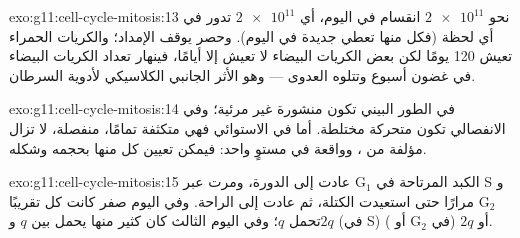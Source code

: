 \begin{solution}{exo:g11:cell-cycle-mitosis:13}
نحو $\num{2e11}$ انقسام في اليوم، أي $\num{2e11}$  تدور في أي لحظة
(فكل منها تعطي  جديدة في اليوم). وحصر  يوقف
الإمداد؛ والكريات الحمراء تعيش 120 يومًا لكن بعض الكريات البيضاء لا
تعيش إلا أيامًا، فينهار تعداد الكريات البيضاء في غضون أسبوع وتتلوه
العدوى --- وهو الأثر الجانبي الكلاسيكي لأدوية السرطان.
\end{solution}

\begin{solution}{exo:g11:cell-cycle-mitosis:14}
في الطور البيني تكون  منشورة غير مرئية؛ وفي الانفصالي تكون
متحركة مختلطة. أما في الاستوائي فهي متكثفة تمامًا، منفصلة، لا تزال
مؤلفة من ، وواقعة في مستوٍ واحد: فيمكن تعيين كل منها بحجمه
وشكله.
\end{solution}

\begin{solution}{exo:g11:cell-cycle-mitosis:15}
 الكبد المرتاحة في $\mathrm{G_1}$ عادت إلى الدورة، ومرت عبر S
و$\mathrm{G_2}$  مرارًا حتى استعيدت الكتلة، ثم عادت
إلى الراحة. وفي اليوم صفر كانت كل  تقريبًا تحمل $q$؛ وفي اليوم
الثالث كان كثير منها يحمل بين $q$ و$2q$ (في S) أو $2q$ (في
$\mathrm{G_2}$ أو ).
\end{solution}


